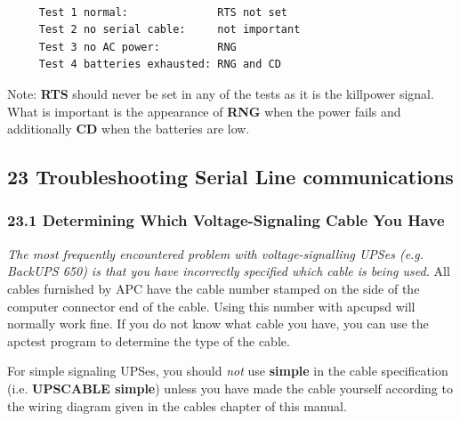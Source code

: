 {{{{{{{{{{\footnotesize
\begin{verbatim}
     
     Test 1 normal:              RTS not set
     Test 2 no serial cable:     not important
     Test 3 no AC power:         RNG
     Test 4 batteries exhausted: RNG and CD
\end{verbatim}
\normalsize

Note: {\bf RTS} should never be set in any of the tests as it is the killpower
signal. What is important is the appearance of {\bf RNG} when the power fails
and additionally {\bf CD} when the batteries are low. 

\label{Troubleshooting-Serial-Line-communications}

\subsection*{23 Troubleshooting Serial Line communications}

\label{index-Problems_002c-Serial-228}
\label{index-Serial-Problems-229}

\label{Determining-Which-Voltage_002dSignaling-Cable-You-Have}

\subsubsection*{23.1 Determining Which Voltage-Signaling Cable You Have}

{\it The most frequently encountered problem with voltage-signalling UPSes
(e.g. BackUPS 650) is that you have incorrectly specified which cable is being
used.} All cables furnished by APC have the cable number stamped on the side
of the computer connector end of the cable. Using this number with apcupsd
will normally work fine. If you do not know what cable you have, you can use
the apctest program to determine the type of the cable.  

For simple signaling UPSes, you should {\it not} use {\bf simple} in the cable
specification (i.e. {\bf UPSCABLE simple}) unless you have made the cable
yourself according to the wiring diagram given in the cables chapter of this
manual. 

}}}}}}}}}}
